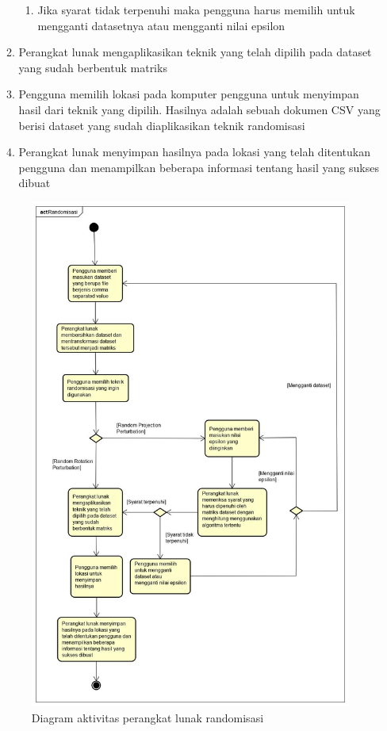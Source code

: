 \documentclass[a4paper,twoside]{article}
\begin{document}
\begin{enumerate}
\begin{enumerate}
\begin{enumerate}
				\item Jika syarat tidak terpenuhi maka pengguna harus memilih untuk mengganti datasetnya atau mengganti nilai epsilon
			\end{enumerate}
			\item Perangkat lunak mengaplikasikan teknik yang telah dipilih pada dataset yang sudah berbentuk matriks
			\item Pengguna memilih lokasi pada komputer pengguna untuk menyimpan hasil dari teknik yang dipilih. Hasilnya adalah sebuah dokumen CSV yang berisi dataset yang sudah diaplikasikan teknik randomisasi
			\item Perangkat lunak menyimpan hasilnya pada lokasi yang telah ditentukan pengguna dan menampilkan beberapa informasi tentang hasil yang sukses dibuat
		\end{enumerate}

		\begin{figure}
			\centering
			\includegraphics[scale=0.4]{activitydiagram}
			\caption{Diagram aktivitas perangkat lunak randomisasi}
			\label{fig:activitydiagram}
		\end{figure}


\end{enumerate}
\end{document}
